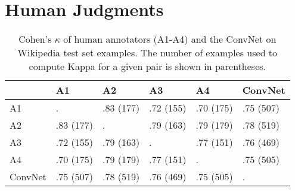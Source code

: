 \section{Human Judgments}
\label{sec:PrepositionHuman}

\begin{table*}
\centering
\begin{tabular}{llllll}
\toprule
           &           A1 &          A2 &          A3 &          A4 &      ConvNet \\
\midrule
A1           &          . &  .83 (177) &  .72 (155) &  .70 (175) &   .75 (507) \\
A2           &  .83 (177) &          . &  .79 (163) &  .79 (179) &   .78 (519) \\
A3           &  .72 (155) &  .79 (163) &          . &  .77 (151) &   .76 (469) \\
A4           &  .70 (175) &  .79 (179) &  .77 (151) &          . &   .75 (505) \\
ConvNet      &  .75 (507) &  .78 (519) &  .76 (469) &  .75 (505) &   . \\
\bottomrule
\end{tabular}
\caption{Cohen's $\kappa$ of human annotators (A1-A4) and the ConvNet on Wikipedia test set examples.  The number of examples used to compute Kappa for a given pair is shown in parentheses.}
\label{tab:Kappa}
\end{table*}

